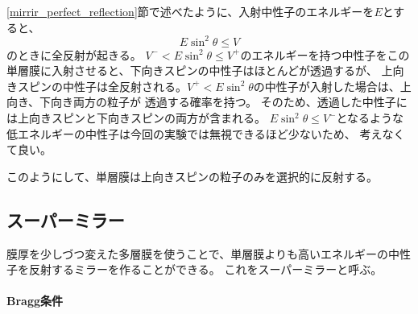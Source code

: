\ref{mirrir_perfect_reflection}節で述べたように、入射中性子のエネルギーを$E$とすると、
\[
E\sin^2\theta\leq V
\]
のときに全反射が起きる。
$V^-< E\sin^2\theta\leq V^+$のエネルギーを持つ中性子をこの単層膜に入射させると、下向きスピンの中性子はほとんどが透過するが、
上向きスピンの中性子は全反射される。$V^+<E\sin^2\theta$の中性子が入射した場合は、上向き、下向き両方の粒子が
透過する確率を持つ。
そのため、透過した中性子には上向きスピンと下向きスピンの両方が含まれる。
$E\sin^2\theta\leq V^-$となるような低エネルギーの中性子は今回の実験では無視できるほど少ないため、
考えなくて良い。

このようにして、単層膜は上向きスピンの粒子のみを選択的に反射する。

\subsection{スーパーミラー}
膜厚を少しづつ変えた多層膜を使うことで、単層膜よりも高いエネルギーの中性子を反射するミラーを作ることができる。
これをスーパーミラーと呼ぶ。
\paragraph{Bragg条件}
